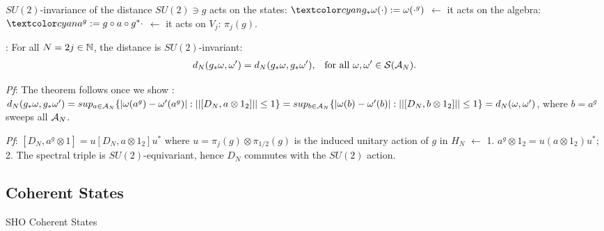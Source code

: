 \begin{frame}{$SU(2)$-invariance of the distance} %
$SU(2) \ni g$ acts on the states: $\lbtext{g_*\omega}(\cdot) := \omega(\cdot^g)$ $\longleftarrow$ it acts on the algebra: $\lbtext{a^g}:= g\circ a \circ g^* \cdot$ $\longleftarrow$ it acts on $V_j$: $\pi_j(g)$.

\textbf{}: For all $N = 2j \in \mathbb N$, the distance is $SU(2)$-invariant: 
\begin{align}
    d_N(g_* \omega, \omega') &= d_N(g_* \omega, g_*\omega'), & \text{for all $\omega, \omega' \in \mathcal S(\mathcal A_N)$}.
\end{align}

\textit{Pf}: The theorem follows once we show 
    \rtext{$||[D_N, a^g]|| = ||[D_N, a]||$}:
$d_N(g_* \omega, g_* \omega') = sup_{a \in \mathcal A_N}\{ |\omega(a^g) - \omega'(a^g)|: ||[D_N, a \otimes 1_2]|| \leq 1 \} = sup_{b \in \mathcal A_N}\{ |\omega(b) - \omega'(b)|: ||[D_N, b \otimes 1_2]|| \leq 1 \} = d_N(\omega, \omega')$, where $b = a^g$ sweeps all $\mathcal A_N$.

\textit{Pf}: $[D_N, a^g \otimes 1] = u[D_N, a \otimes 1_2]u^*$ where $u = \pi_j(g) \otimes \pi_{1/2}(g)$ is the induced unitary action of $g$ in $H_N$ $\xleftarrow{}$
1. $a^g \otimes 1_2 = u(a \otimes 1_2)u^*$;
2. The spectral triple is $SU(2)$-equivariant, hence $D_N$ commutes with the $SU(2)$ action.
\end{frame}

\subsection{Coherent States}

\begin{frame}{SHO Coherent States} %

\end{frame}

